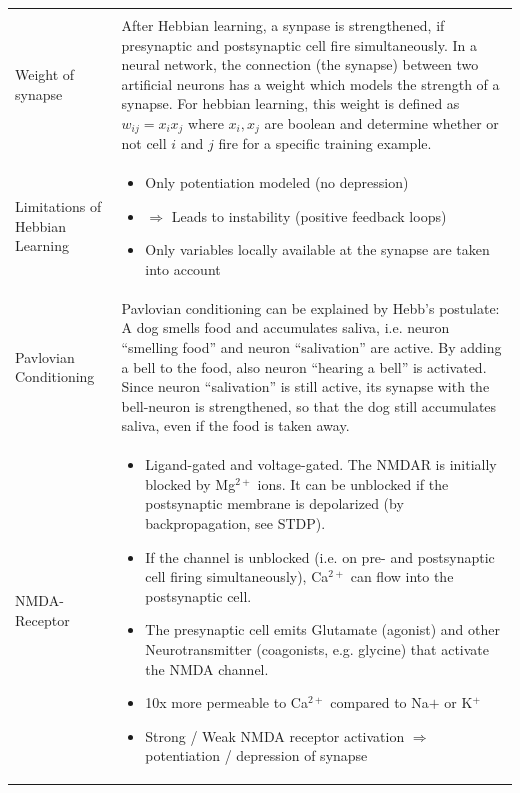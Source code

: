 \begin{longtable}{p{4cm}p{15cm}}
\begin{itemize}
			    \end{itemize}\\
Weight of synapse	& After Hebbian learning, a synpase is strengthened, if presynaptic and postsynaptic cell fire simultaneously. In a neural network, the connection (the synapse) between two artificial neurons has a weight which models the strength of a synapse. For hebbian learning, this weight is defined as $w_{ij} = x_ix_j$ where $x_i, x_j$ are boolean and determine whether or not cell $i$ and $j$ fire for a specific training example.\\
Limitations of Hebbian Learning	& \begin{itemize}
                               	  	\item Only potentiation modeled (no depression)
					\item $\Rightarrow$ Leads to instability (positive feedback loops)
					\item Only variables locally available at the synapse are taken into account
                               	  \end{itemize}\\
Pavlovian Conditioning	& Pavlovian conditioning can be explained by Hebb's postulate: A dog smells food and accumulates saliva, i.e. neuron ``smelling food'' and neuron ``salivation'' are active. By adding a bell to the food, also neuron ``hearing a bell'' is activated. Since neuron ``salivation'' is still active, its synapse with the bell-neuron is strengthened, so that the dog still accumulates saliva, even if the food is taken away.\\
NMDA-Receptor		& \begin{itemize}
				\item Ligand-gated and voltage-gated. The NMDAR is initially blocked by Mg$^{2+}$ ions. It can be unblocked if the postsynaptic membrane is depolarized (by backpropagation, see STDP).
				\item If the channel is unblocked (i.e. on pre- and postsynaptic cell firing simultaneously), Ca$^{2+}$ can flow into the postsynaptic cell.
				\item The presynaptic cell emits Glutamate (agonist) and other Neurotransmitter (coagonists, e.g. glycine) that activate the NMDA channel.
				\item 10x more permeable to Ca$^{2+}$ compared to Na$+$ or K$^+$
				\item Strong / Weak NMDA receptor activation $\Rightarrow$ potentiation / depression of synapse
            		  \end{itemize}\\

\end{longtable}
